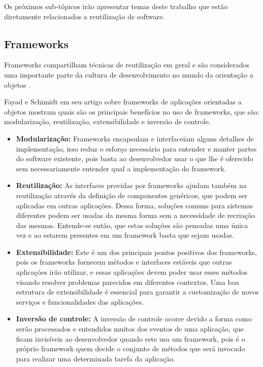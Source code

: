 Os próximos sub-tópicos irão apresentar temas deste trabalho que estão diretamente relacionados a reutilização de software.

\subsection{Frameworks}

Frameworks compartilham técnicas de reutilização em geral e são considerados uma importante parte da cultura de desenvolvimento no mundo da orientação a objetos \cite{Johnson:1997}.

Fayad e Schimidt em seu artigo \cite{Fayad:Schimidt:1997} sobre frameworks de aplicações orientadas a objetos mostram quais são os principais benefícios no uso de frameworks, que são: modularização, reutilização, extensibilidade e inversão de controle.

\begin{itemize}
	\item \textbf{Modularização:} Frameworks encapsulam e interfaceiam alguns detalhes de implementação, isso reduz o esforço necessário para entender e manter partes do software existente, pois basta ao desenvolvedor usar o que lhe é oferecido sem necessariamente entender qual a implementação do framework.

	\item \textbf{Reutilização:} As interfaces providas por frameworks ajudam também na reutilização através da definição de componentes genéricos, que podem ser aplicadas em outras aplicações. Dessa forma, soluções comuns para sistemas diferentes podem ser usadas da mesma forma sem a necessidade de recriação das mesmas. Entende-se então, que estas soluções são pensadas uma única vez e ao estarem presentes em um framework basta que sejam usadas.

	\item \textbf{Extensibilidade:} Este é um dos principais pontos positivos dos frameworks, pois os frameworks fornecem métodos e interfaces estáveis que outras aplicações irão utilizar, e essas aplicações devem poder usar esses métodos visando resolver problemas parecidos em diferentes contextos. Uma boa estrutura de extensibilidade é essencial para garantir a customização de novos serviços e funcionalidades das aplicações.

	\item \textbf{Inversão de controle:} A inversão de controle ocorre devido a forma como serão processados e entendidos muitos dos eventos de uma aplicação, que ficam invisíveis ao desenvolvedor quando este usa um framework, pois é o próprio framework quem decide o conjunto de métodos que será invocado para realizar uma determinada tarefa da aplicação.
\end{itemize}

